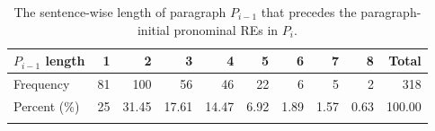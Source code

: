 \begin{table}
\begin{tabular}{lrrrrrrrrr}
  \lsptoprule
$P_{i-1}$ length & 1 & 2 & 3 & 4 & 5 & 6 & 7 & 8 & Total \\ 
  \midrule
Frequency &  81 & 100 & 56 & 46 & 22 & 6 & 5 & 2 & 318 \\ 
  Percent (\%) &  25 & 31.45 & 17.61 & 14.47 & 6.92 & 1.89 & 1.57 & 0.63 & 100.00 \\ 
   \lspbottomrule
\end{tabular}
\caption[The sentence-wise length of paragraph $P_{i-1}$.]{The sentence-wise length of paragraph $P_{i-1}$ that precedes the paragraph-initial pronominal REs in $P_{i}$.}
\label{tab:firstrefpron}
\end{table}
